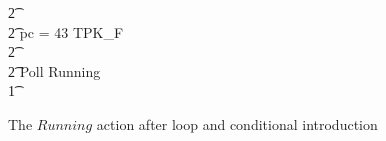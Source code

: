 \begin{figure}[t!]
\begin{circus}
    \t2 {} \cdots {} \\
    \t2 {} \circelse pc = 43 \circthen TPK\_F \\
    \t2 {} \cdots {} \\
    \t2 \circfi \circseq Poll \circseq Running \\
    \t1 \circfi
  \end{circus}
  \caption{The $Running$ action after loop and conditional introduction}
  \label{loop-and-conditional-introduction-example-figure}
\end{figure}

